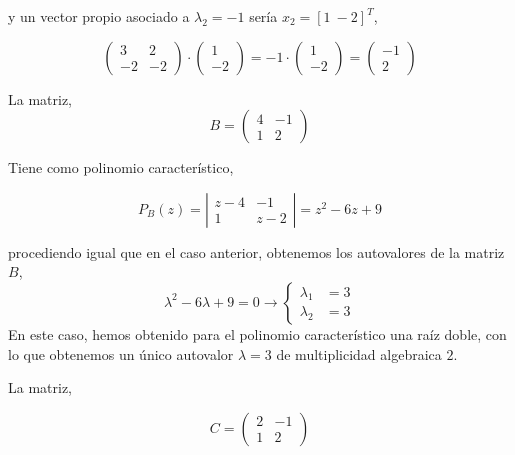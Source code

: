 y un vector propio asociado a $\lambda_2=-1$ sería $x_2=[1\ -2]^T$,

\begin{equation*}
\begin{pmatrix}
3& 2\\
-2& -2
\end{pmatrix}\cdot \begin{pmatrix}
1\\
-2
\end{pmatrix}=-1\cdot \begin{pmatrix}
1\\
-2
\end{pmatrix} =\begin{pmatrix}
-1\\
2
\end{pmatrix} 
\end{equation*}

La matriz,
\begin{equation*}
B=\begin{pmatrix}
4& -1\\
1& 2
\end{pmatrix}
\end{equation*}

Tiene como polinomio característico,

\begin{equation*}
P_B(z)=\left\vert\begin{matrix}
z-4& -1\\
1& z-2 
\end{matrix} \right\vert=z^2-6z+9
\end{equation*}

procediendo igual que en el caso anterior, obtenemos los autovalores de la matriz $B$,
\begin{equation*}
\lambda^2-6\lambda+9=0 \rightarrow \left\{ 
\begin{aligned}
\lambda_1&=3\\
\lambda_2&=3
\end{aligned}
\right.
\end{equation*}
En este caso, hemos obtenido para el polinomio característico una raíz doble, con lo que obtenemos un único autovalor $\lambda=3$ de multiplicidad algebraica $2$.

La matriz,

\begin{equation*}
C=\begin{pmatrix}
2& -1\\
1& 2
\end{pmatrix}
\end{equation*}

